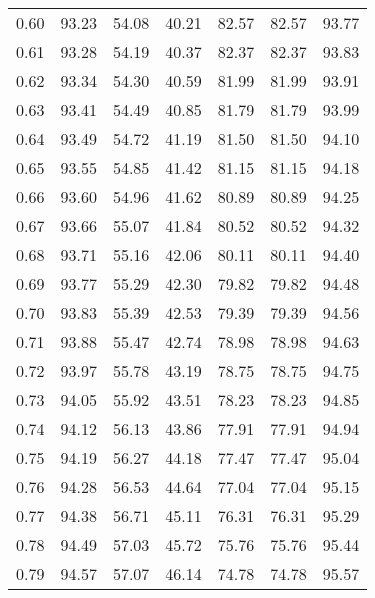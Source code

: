 \begin{tabular}{|c|c|c|c|c|c|c|}
      0.60 &     93.23 &     54.08 &      40.21 &   82.57 &      82.57 &         93.77 \\
      0.61 &     93.28 &     54.19 &      40.37 &   82.37 &      82.37 &         93.83 \\
      0.62 &     93.34 &     54.30 &      40.59 &   81.99 &      81.99 &         93.91 \\
      0.63 &     93.41 &     54.49 &      40.85 &   81.79 &      81.79 &         93.99 \\
      0.64 &     93.49 &     54.72 &      41.19 &   81.50 &      81.50 &         94.10 \\
      0.65 &     93.55 &     54.85 &      41.42 &   81.15 &      81.15 &         94.18 \\
      0.66 &     93.60 &     54.96 &      41.62 &   80.89 &      80.89 &         94.25 \\
      0.67 &     93.66 &     55.07 &      41.84 &   80.52 &      80.52 &         94.32 \\
      0.68 &     93.71 &     55.16 &      42.06 &   80.11 &      80.11 &         94.40 \\
      0.69 &     93.77 &     55.29 &      42.30 &   79.82 &      79.82 &         94.48 \\
      0.70 &     93.83 &     55.39 &      42.53 &   79.39 &      79.39 &         94.56 \\
      0.71 &     93.88 &     55.47 &      42.74 &   78.98 &      78.98 &         94.63 \\
      0.72 &     93.97 &     55.78 &      43.19 &   78.75 &      78.75 &         94.75 \\
      0.73 &     94.05 &     55.92 &      43.51 &   78.23 &      78.23 &         94.85 \\
      0.74 &     94.12 &     56.13 &      43.86 &   77.91 &      77.91 &         94.94 \\
      0.75 &     94.19 &     56.27 &      44.18 &   77.47 &      77.47 &         95.04 \\
      0.76 &     94.28 &     56.53 &      44.64 &   77.04 &      77.04 &         95.15 \\
      0.77 &     94.38 &     56.71 &      45.11 &   76.31 &      76.31 &         95.29 \\
      0.78 &     94.49 &     57.03 &      45.72 &   75.76 &      75.76 &         95.44 \\
      0.79 &     94.57 &     57.07 &      46.14 &   74.78 &      74.78 &         95.57 \\

\end{tabular}
